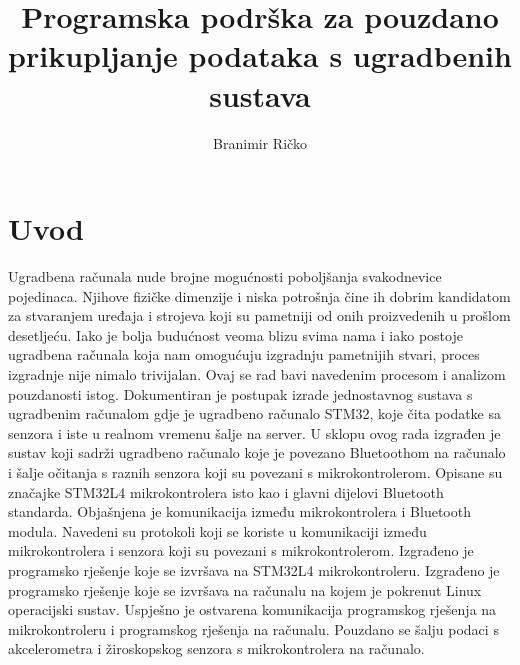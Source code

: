 \documentclass[times, utf8, diplomski]{diplomski}
\begin{document}

\title{Programska podrška za pouzdano prikupljanje podataka s ugradbenih sustava}

\author{Branimir Ričko}

\maketitle


\tableofcontents

\chapter{Uvod}
Ugradbena računala nude brojne mogućnosti poboljšanja svakodnevice pojedinaca.
Njihove fizičke dimenzije i niska potrošnja čine ih dobrim kandidatom za stvaranjem uređaja i strojeva koji su pametniji od onih proizvedenih u prošlom desetljeću.
Iako je bolja budućnost veoma blizu svima nama i iako postoje ugradbena računala koja nam omogućuju izgradnju pametnijih stvari, proces izgradnje nije nimalo trivijalan.
Ovaj se rad bavi navedenim procesom i analizom pouzdanosti istog.
Dokumentiran je postupak izrade jednostavnog sustava s ugradbenim računalom gdje je ugradbeno računalo STM32, koje čita podatke sa senzora i iste u realnom vremenu šalje na server.
U sklopu ovog rada izgrađen je sustav koji sadrži ugradbeno računalo koje je povezano Bluetoothom na računalo i šalje očitanja s raznih senzora koji su povezani s mikrokontrolerom.
Opisane su značajke STM32L4 mikrokontrolera isto kao i glavni dijelovi Bluetooth standarda.
Objašnjena je komunikacija između mikrokontrolera i Bluetooth modula.
Navedeni su protokoli koji se koriste u komunikaciji između mikrokontrolera i senzora koji su povezani s mikrokontrolerom.
Izgrađeno je programsko rješenje koje se izvršava na STM32L4 mikrokontroleru.
Izgrađeno je programsko rješenje koje se izvršava na računalu na kojem je pokrenut Linux operacijski sustav.
Uspješno je ostvarena komunikacija programskog rješenja na mikrokontroleru i programskog rješenja na računalu.
Pouzdano se šalju podaci s akcelerometra i žiroskopskog senzora s mikrokontrolera na računalo.
\end{document}
